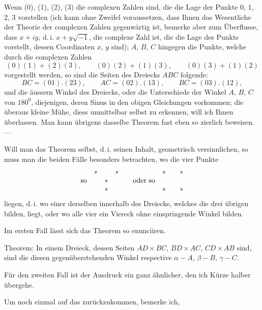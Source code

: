 Wenn (0), (1), (2), (3) die complexen Zahlen sind, die die Lage der Punkte 0, 1, 2, 3 vorstellen (ich kann ohne Zweifel voraussetzen, dass Ihnen das Wesentliche der Theorie der complexen Zahlen gegenwärtig ist, bemerke aber zum Überflusse, dass $x+iy$, d.\,i. $x+y\sqrt{-1}$, die complexe Zahl ist, die die Lage des Punkts vorstellt, dessen Coordinaten $x$, $y$ sind); $A$, $B$, $C$ hingegen die Punkte, welche durch die complexen Zahlen
\[
(0)(1)+(2)(3),\qquad (0)(2)+(1)(3),\qquad (0)(3)+(1)(2)
\]
vorgestellt werden, so sind die Seiten des Dreiecks $ABC$ folgende:
\[
BC=(01).(23),\qquad AC=(02).(13),\qquad BC=(03).(12), \]
und die äussern Winkel des Dreiecks, oder die Unterschiede der Winkel $A$, $B$, $C$ von $180^0$, diejenigen, deren Sinus in den obigen Gleichungen vorkommen; die überaus kleine Mühe, diess unmittelbar selbst zu erkennen, will ich Ihnen überlassen. Man kann übrigens dasselbe Theorem fast eben so zierlich  beweisen. —

Will man das Theorem selbst, d.\,i. seinen Inhalt, geometrisch versinnlichen, so muss man die beiden Fälle besonders betrachten, wo die vier Punkte
\[
\begin{array}{c@{\quad}ccc@{\qquad}c@{\quad}ccc}
 & * & & * & & * & & *\\
\text{so} & & * & & \text{oder so} & & &\\
 & & * & & & * & & *
\end{array}
\]
liegen, d.\,i. wo einer derselben innerhalb des Dreiecks, welches die drei übrigen bilden, liegt, oder wo alle vier ein Viereck ohne einspringende Winkel bilden.

Im ersten Fall lässt sich das Theorem so enunciiren.

Theorem: In einem Dreieck, dessen Seiten $AD\times BC$, $BD\times AC$, $CD\times AB$ sind, sind die diesen gegenüberstehenden Winkel respective $\alpha-A$, $\beta-B$, $\gamma-C$.

\begin{center}\end{center}

Für den zweiten Fall ist der Ausdruck ein ganz ähnlicher, den ich Kürze halber übergehe.

Um noch einmal auf das  zurückzukommen, bemerke ich,

